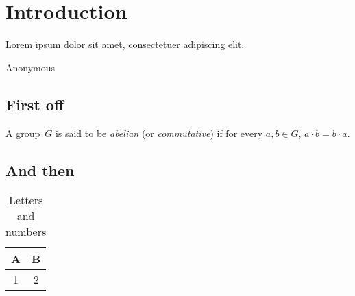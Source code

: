 
\chapter{Introduction}

\epigraph{Lorem ipsum dolor sit amet,
consectetuer adipiscing elit.}{Anonymous}

\blindtext

\section{First off}

\blindtext\pagenote{\blindtext}

\blindtext

\begin{defn}
A group~$G$ is said to be \emph{abelian} (or \emph{commutative}) if
for every $a, b \in G$, $a \cdot b = b \cdot a$.
\end{defn}

\blindtext

\section{And then}

\blindtext[3]

\begin{table}
  \begin{center}
  \begin{tabular}{c|c}
    A & B \\
    \hline
    1 & 2
  \end{tabular}
  \end{center}
  \caption{Letters and numbers}
\end{table}

\blindtext[2]
